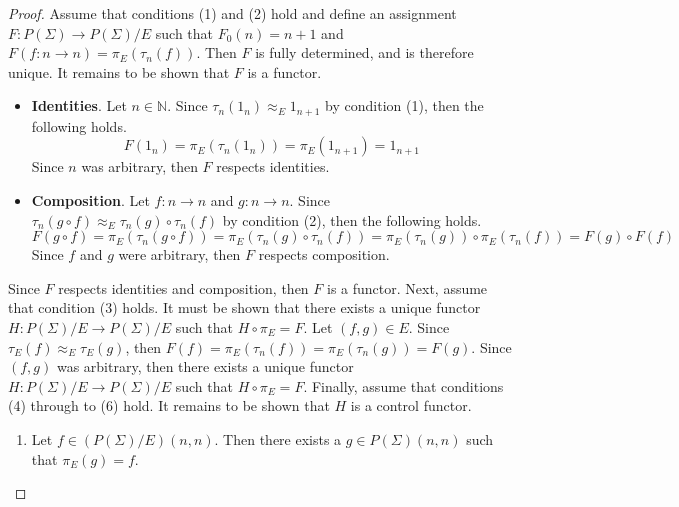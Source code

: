\begin{proof}
    Assume that conditions (1) and (2) hold and define an assignment $F: P( \Sigma ) \to P( \Sigma ) / E$ such that $F_0( n ) = n + 1$ and $F( f : n \to n ) = \pi_E( \tau_n( f ) )$.
    Then $F$ is fully determined, and is therefore unique.
    It remains to be shown that $F$ is a functor.
    \begin{itemize}
    \item \textbf{Identities}.
          Let $n \in \mathbb{N}$.
          Since $\tau_n( 1_n ) \approx_E 1_{n+1}$ by condition (1), then the following holds.
          \begin{equation*}
              F( 1_n )
              =
              \pi_E( \tau_n( 1_n ) )
              =
              \pi_E( 1_{n+1} )
              =
              1_{n+1}
          \end{equation*}
          Since $n$ was arbitrary, then $F$ respects identities.
    \item \textbf{Composition}.
          Let $f: n \to n$ and $g: n \to n$.
          Since $\tau_n( g \circ f ) \approx_E \tau_n( g ) \circ \tau_n( f )$ by condition (2), then the following holds.
          \begin{equation*}
              F( g \circ f )
              =
              \pi_E( \tau_n( g \circ f ) )
              =
              \pi_E( \tau_n( g ) \circ \tau_n( f ) )
              =
              \pi_E( \tau_n( g ) ) \circ \pi_E( \tau_n( f ) )
              =
              F( g ) \circ F( f )
          \end{equation*}
          Since $f$ and $g$ were arbitrary, then $F$ respects composition.
    \end{itemize}
    Since $F$ respects identities and composition, then $F$ is a functor.
    Next, assume that condition (3) holds.
    It must be shown that there exists a unique functor $H: P( \Sigma ) / E \to P( \Sigma ) / E$ such that $H \circ \pi_E = F$.
    Let $( f, g ) \in E$.
    Since $\tau_E( f ) \approx_E \tau_E( g )$, then $F( f ) = \pi_E( \tau_n( f ) ) = \pi_E( \tau_n( g ) ) = F( g )$.
    Since $( f, g )$ was arbitrary, then there exists a unique functor $H: P( \Sigma ) / E \to P( \Sigma ) / E$ such that $H \circ \pi_E = F$.
    Finally, assume that conditions (4) through to (6) hold.
    It remains to be shown that $H$ is a control functor.
    \begin{enumerate}
    \item Let $f \in ( P( \Sigma ) / E )( n, n )$.
          Then there exists a $g \in P( \Sigma )( n, n )$ such that $\pi_E( g ) = f$.

\end{enumerate}
\end{proof}
